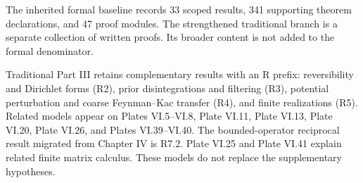 The inherited formal baseline records 33 scoped results, 341 supporting theorem declarations, and 47 proof modules. The strengthened traditional branch is a separate collection of written proofs. Its broader content is not added to the formal denominator.

Traditional Part III retains complementary results with an R prefix: reversibility and Dirichlet forms (R2), prior disintegrations and filtering (R3), potential perturbation and coarse Feynman--Kac transfer (R4), and finite realizations (R5). Related models appear on Plates VI.5--VI.8, Plate VI.11, Plate VI.13, Plate VI.20, Plate VI.26, and Plates VI.39--VI.40. The bounded-operator reciprocal result migrated from Chapter IV is R7.2. Plate VI.25 and Plate VI.41 explain related finite matrix calculus. These models do not replace the supplementary hypotheses.
